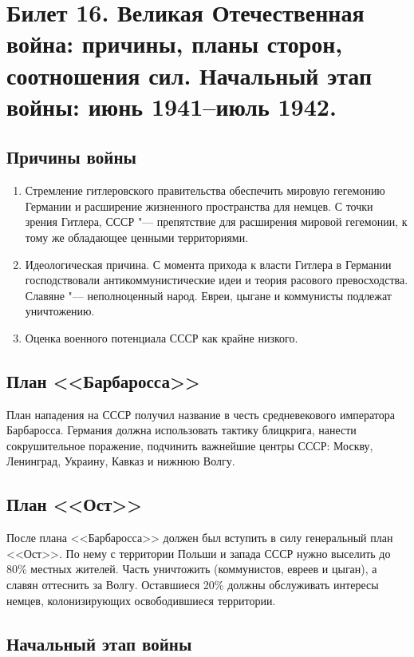 \section{Билет 16. Великая Отечественная война: причины, планы сторон, соотношения сил. Начальный этап войны: июнь 1941--июль 1942.}

\subsection{Причины войны}
\begin{enumerate}
    \item Стремление гитлеровского правительства обеспечить мировую гегемонию Германии и расширение жизненного пространства для немцев. С точки зрения Гитлера, СССР "--- препятствие для расширения мировой гегемонии, к тому же обладающее ценными территориями.
    \item Идеологическая причина. С момента прихода к власти Гитлера в Германии господствовали антикоммунистические идеи и теория расового превосходства. Славяне "--- неполноценный народ. Евреи, цыгане и коммунисты подлежат уничтожению.
    \item Оценка военного потенциала СССР как крайне низкого.
\end{enumerate}

\subsection{План <<Барбаросса>>}

План нападения на СССР получил название в честь средневекового императора Барбаросса. Германия должна использовать тактику блицкрига, нанести сокрушительное поражение, подчинить важнейшие центры СССР: Москву, Ленинград, Украину, Кавказ и нижнюю Волгу. 

\subsection{План <<Ост>>}

После плана <<Барбаросса>> должен был вступить в силу генеральный план <<Ост>>. По нему с территории Польши и запада СССР нужно выселить до 80\% местных жителей. Часть уничтожить (коммунистов, евреев и цыган), а славян оттеснить за Волгу. Оставшиеся 20\% должны обслуживать интересы немцев, колонизирующих освободившиеся территории.

\subsection{Начальный этап войны}

